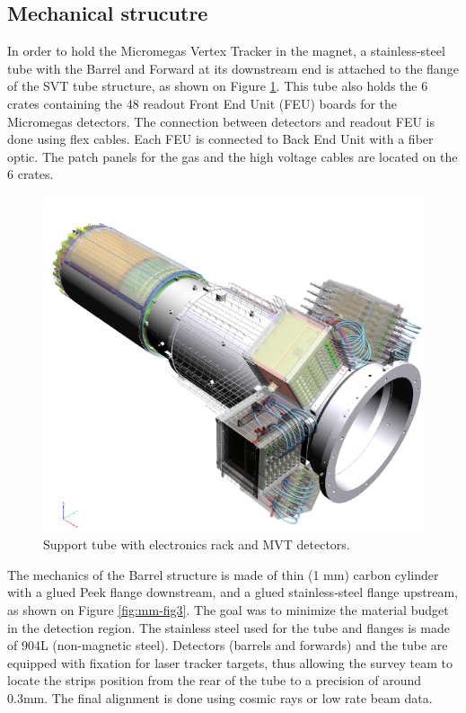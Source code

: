 \subsection{Mechanical strucutre}
In order to hold the Micromegas Vertex Tracker in the magnet, a stainless-steel tube with the Barrel and Forward at 
its downstream end is attached to the flange of the SVT tube structure, as shown on Figure \ref{fig:mm-fig2}. This tube 
also holds the 6 crates containing the 48 readout Front End Unit (FEU) boards for the Micromegas detectors. The 
connection between detectors and readout FEU is done using flex cables. Each FEU is connected to Back End Unit with a 
fiber optic. The patch panels for the gas and the high voltage cables are located on the 6 crates.

\begin{figure}[htb]
 \includegraphics[width=1.0\columnwidth,keepaspectratio]{images/fig2}
 \caption{Support tube with electronics rack and MVT detectors.}
 \label{fig:mm-fig2}
\end{figure}

The mechanics of the Barrel structure is made of thin (1 mm) carbon cylinder with a glued Peek flange downstream, and a 
glued stainless-steel flange upstream, as shown on Figure \ref{fig:mm-fig3}. The goal was to minimize the material 
budget in the detection region. The stainless steel used for the tube and flanges is made of 904L (non-magnetic steel). 
Detectors (barrels and forwards) and the tube are equipped with fixation for laser tracker targets, thus allowing the 
survey team to locate the strips position from the rear of the tube to a precision of around 0.3mm. The final alignment 
is done using cosmic rays or low rate beam data. 

